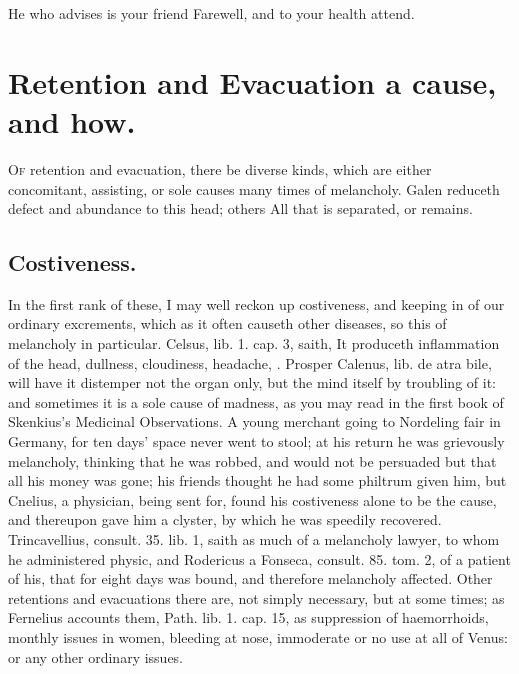 {{He who advises is your friend
Farewell, and to your health attend.


\section{Retention and Evacuation a cause, and how.}

\lettrine{O}{f} retention and evacuation, there be diverse kinds, which are either
concomitant, assisting, or sole causes many times of melancholy. 
Galen reduceth defect and abundance to this head; others All that
is separated, or remains.

\subsection{Costiveness.}

In the first rank of these, I may well reckon up
costiveness, and keeping in of our ordinary excrements, which as it
often causeth other diseases, so this of melancholy in particular.
Celsus, lib. 1. cap. 3, saith, It produceth inflammation of the
head, dullness, cloudiness, headache, \etc{}. Prosper Calenus, lib. de atra
bile, will have it distemper not the organ only, but the mind
itself by troubling of it: and sometimes it is a sole cause of madness,
as you may read in the first book of Skenkius's Medicinal
Observations. A young merchant going to Nordeling fair in Germany, for
ten days' space never went to stool; at his return he was
grievously melancholy, thinking that he was robbed, and would not
be persuaded but that all his money was gone; his friends thought he
had some philtrum given him, but Cnelius, a physician, being sent for,
found his costiveness alone to be the cause, and thereupon gave
him a clyster, by which he was speedily recovered. Trincavellius,
consult. 35. lib. 1, saith as much of a melancholy lawyer, to whom he
administered physic, and Rodericus a Fonseca, consult. 85. tom. 2,
of a patient of his, that for eight days was bound, and therefore
melancholy affected. Other retentions and evacuations there are, not
simply necessary, but at some times; as Fernelius accounts them, Path.
lib. 1. cap. 15, as suppression of haemorrhoids, monthly issues in
women, bleeding at nose, immoderate or no use at all of Venus: or any
other ordinary issues.

}}

